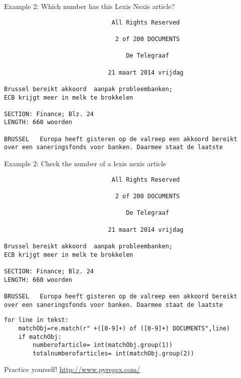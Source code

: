 \documentclass{beamer}
\begin{document}
\begin{frame}[fragile]{Example 2: Which number has this Lexis Nexis article?}
\begin{lstlisting}
                              All Rights Reserved

                               2 of 200 DOCUMENTS

                                  De Telegraaf

                             21 maart 2014 vrijdag

Brussel bereikt akkoord  aanpak probleembanken;
ECB krijgt meer in melk te brokkelen

SECTION: Finance; Blz. 24
LENGTH: 660 woorden

BRUSSEL   Europa heeft gisteren op de valreep een akkoord bereikt 
over een saneringsfonds voor banken. Daarmee staat de laatste
\end{lstlisting}

\end{frame}

\begin{frame}[fragile]{Example 2: Check the number of a lexis nexis article}
\begin{lstlisting}
                              All Rights Reserved

                               2 of 200 DOCUMENTS

                                  De Telegraaf

                             21 maart 2014 vrijdag

Brussel bereikt akkoord  aanpak probleembanken;
ECB krijgt meer in melk te brokkelen

SECTION: Finance; Blz. 24
LENGTH: 660 woorden

BRUSSEL   Europa heeft gisteren op de valreep een akkoord bereikt 
over een saneringsfonds voor banken. Daarmee staat de laatste
\end{lstlisting}

\begin{lstlisting}
for line in tekst:
    matchObj=re.match(r" +([0-9]+) of ([0-9]+) DOCUMENTS",line)
    if matchObj:
        numberofarticle= int(matchObj.group(1))
        totalnumberofarticles= int(matchObj.group(2))
\end{lstlisting}
\end{frame}


\begin{frame}{Practice yourself!}
\huge{\url{http://www.pyregex.com/}}
\end{frame}
\end{document}
